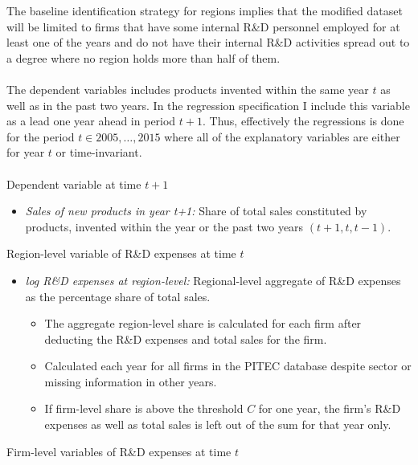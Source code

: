 The baseline identification strategy for regions implies that the modified dataset will be limited to firms that have some internal R\&D personnel employed for at least one of the years and do not have their internal R\&D activities spread out to a degree where no region holds more than half of them.
\\
\\
The dependent variables includes products invented within the same year $t$ as well as in the past two years. In the regression specification I include this variable as a lead one year ahead in period $t+1$. Thus, effectively the regressions is done for the period $t\in 2005,\dots,2015$ where all of the explanatory variables are either for year $t$ or time-invariant.
\\
\\
Dependent variable at time $t+1$
\begin{itemize}
  \item \textit{Sales of new products in year t+1:} Share of total sales constituted by products, invented within the year or the past two years $(t+1,t,t-1)$.
\end{itemize}
\noindent
Region-level variable of R\&D expenses at time $t$
\begin{itemize}
  \item \textit{log R\&D expenses at region-level:} Regional-level aggregate of R\&D expenses as the percentage share of total sales.
  \begin{itemize}
    \item The aggregate region-level share is calculated for each firm after deducting the R\&D expenses and total sales for the firm.
    \item Calculated each year for all firms in the PITEC database despite sector or missing information in other years.
    \item If firm-level share is above the threshold $C$ for one year, the firm's R\&D expenses as well as total sales is left out of the sum for that year only.
  \end{itemize}
\end{itemize}
\noindent
Firm-level variables of R\&D expenses at time $t$

